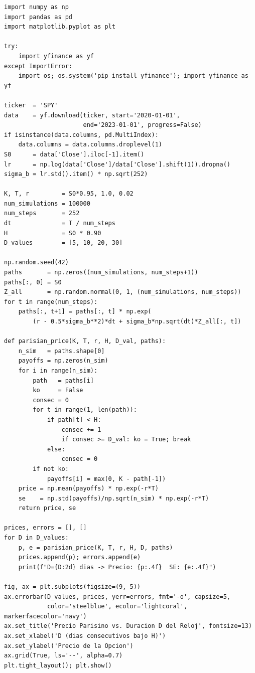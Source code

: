 \documentclass[12pt,letterpaper]{article}
\begin{document}
\begin{lstlisting}[style=python, caption={Laboratorio 5 -- Opcion parisina}]
import numpy as np
import pandas as pd
import matplotlib.pyplot as plt

try:
    import yfinance as yf
except ImportError:
    import os; os.system('pip install yfinance'); import yfinance as yf

ticker  = 'SPY'
data    = yf.download(ticker, start='2020-01-01',
                      end='2023-01-01', progress=False)
if isinstance(data.columns, pd.MultiIndex):
    data.columns = data.columns.droplevel(1)
S0      = data['Close'].iloc[-1].item()
lr      = np.log(data['Close']/data['Close'].shift(1)).dropna()
sigma_b = lr.std().item() * np.sqrt(252)

K, T, r         = S0*0.95, 1.0, 0.02
num_simulations = 100000
num_steps       = 252
dt              = T / num_steps
H               = S0 * 0.90
D_values        = [5, 10, 20, 30]

np.random.seed(42)
paths       = np.zeros((num_simulations, num_steps+1))
paths[:, 0] = S0
Z_all       = np.random.normal(0, 1, (num_simulations, num_steps))
for t in range(num_steps):
    paths[:, t+1] = paths[:, t] * np.exp(
        (r - 0.5*sigma_b**2)*dt + sigma_b*np.sqrt(dt)*Z_all[:, t])

def parisian_price(K, T, r, H, D_val, paths):
    n_sim   = paths.shape[0]
    payoffs = np.zeros(n_sim)
    for i in range(n_sim):
        path   = paths[i]
        ko     = False
        consec = 0
        for t in range(1, len(path)):
            if path[t] < H:
                consec += 1
                if consec >= D_val: ko = True; break
            else:
                consec = 0
        if not ko:
            payoffs[i] = max(0, K - path[-1])
    price = np.mean(payoffs) * np.exp(-r*T)
    se    = np.std(payoffs)/np.sqrt(n_sim) * np.exp(-r*T)
    return price, se

prices, errors = [], []
for D in D_values:
    p, e = parisian_price(K, T, r, H, D, paths)
    prices.append(p); errors.append(e)
    print(f"D={D:2d} dias -> Precio: {p:.4f}  SE: {e:.4f}")

fig, ax = plt.subplots(figsize=(9, 5))
ax.errorbar(D_values, prices, yerr=errors, fmt='-o', capsize=5,
            color='steelblue', ecolor='lightcoral', markerfacecolor='navy')
ax.set_title('Precio Parisino vs. Duracion D del Reloj', fontsize=13)
ax.set_xlabel('D (dias consecutivos bajo H)')
ax.set_ylabel('Precio de la Opcion')
ax.grid(True, ls='--', alpha=0.7)
plt.tight_layout(); plt.show()
\end{lstlisting}
\end{document}

